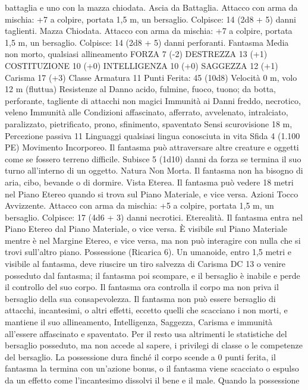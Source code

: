 \begin{multicols}{2}
battaglia e uno con la mazza chiodata.
Ascia da Battaglia. Attacco con arma da mischia: +7 a colpire,
portata 1,5 m, un bersaglio.
Colpisce: 14 (2d8 + 5) danni taglienti.
Mazza Chiodata. Attacco con arma da mischia: +7 a colpire,
portata 1,5 m, un bersaglio.
Colpisce: 14 (2d8 + 5) danni perforanti.
Fantasma
Media non morto, qualsiasi allineamento
FORZA 7 (-2)
DESTREZZA 13 (+1)
COSTITUZIONE 10 (+0)
INTELLIGENZA 10 (+0)
SAGGEZZA 12 (+1)
Carisma 17 (+3)
Classe Armatura 11
\hspace*{0pt}\hfill{Punti Ferita}: 45 (10d8)
Velocità 0 m, volo 12 m (fluttua)
Resistenze al Danno acido, fulmine, fuoco, tuono; da botta,
perforante, tagliente di attacchi non magici
Immunità ai Danni freddo, necrotico, veleno
Immunità alle Condizioni affascinato, afferrato, avvelenato,
intralciato, paralizzato, pietrificato, prono, sfinimento, spaventato
Sensi scurovisione 18 m, Percezione passiva 11
Linguaggi qualsiasi lingua conosciuta in vita
Sfida 4 (1.100 PE)
Movimento Incorporeo. Il fantasma può attraversare altre creature e
oggetti come se fossero terreno difficile. Subisce 5 (1d10) danni da
forza se termina il suo turno all’interno di un oggetto.
Natura Non Morta. Il fantasma non ha bisogno di aria, cibo,
bevande o di dormire.
Vista Eterea. Il fantasma può vedere 18 metri nel Piano Etereo
quando si trova sul Piano Materiale, e vice versa.
Azioni
Tocco Avvizzente. Attacco con arma da mischia: +5 a colpire,
portata 1,5 m, un bersaglio.
Colpisce: 17 (4d6 + 3) danni necrotici.
Eterealità. Il fantasma entra nel Piano Etereo dal Piano Materiale, o vice
versa. È visibile sul Piano Materiale mentre è nel Margine Etereo, e vice
versa, ma non può interagire con nulla che si trovi sull’altro piano.
Possessione (Ricarica 6). Un umanoide, entro 1,5 metri e visibile al
fantasma, deve riuscire un tiro salvezza di Carisma DC 13 o venire
posseduto dal fantasma; il fantasma poi scompare, e il bersaglio è inabile
e perde il controllo del suo corpo. Il fantasma ora controlla il corpo ma
non priva il bersaglio della sua consapevolezza. Il fantasma non può
essere bersaglio di attacchi, incantesimi, o altri effetti, eccetto quelli che
scacciano i non morti, e mantiene il suo allineamento, Intelligenza,
Saggezza, Carisma e immunità all’essere affascinato e spaventato. Per il
resto usa altrimenti le statistiche del bersaglio posseduto, ma non accede
al sapere, i privilegi di classe o le competenze del bersaglio.
La possessione dura finché il corpo scende a 0 punti ferita, il fantasma la
termina con un’azione bonus, o il fantasma viene scacciato o espulso da un
effetto come l’incantesimo dissolvi il bene e il male. Quando la possessione

\end{multicols}
